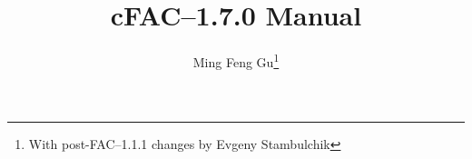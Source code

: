 \documentclass[twoside,a4paper]{refrep}
\newcommand{\cFAC}{{cFAC}\xspace}
\newcommand{\facversion}{{1.7.0}\xspace}
\newcounter{faq}[section]
\newcommand{\+}{\discretionary{\mbox{\scriptsize$\hookleftarrow$}}{}{}}
\begin{document}
\title{\cFAC--\facversion Manual}
\author{Ming Feng Gu\thanks{With post-FAC--1.1.1 changes by Evgeny Stambulchik}}

\date{}

\maketitle

\tableofcontents

















\printindex


\end{document}
